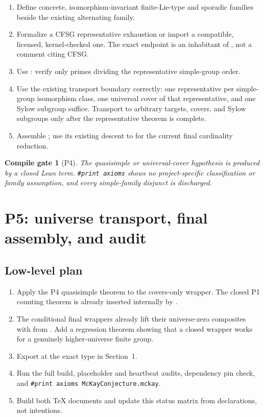 \documentclass[11pt]{article}
\newtheorem{gate}{Compile gate}
\begin{document}
\begin{enumerate}[label=\textbf{P4.\arabic*.},leftmargin=*]
  \item Define concrete, isomorphism-invariant finite-Lie-type and sporadic
  families beside the existing alternating family.
  \item Formalize a CFSG representative exhaustion or import a compatible,
  licensed, kernel-checked one.  The exact endpoint is an inhabitant of
  , not a comment citing CFSG.
  \item Use
  : verify only primes dividing
  the representative simple-group order.
  \item Use the existing transport boundary correctly: one representative
  per simple-group isomorphism class, one universal cover of that
  representative, and one Sylow subgroup suffice.  Transport to arbitrary
  targets, covers, and Sylow subgroups only after the representative theorem
  is complete.
  \item Assemble
  ; use its existing descent
  to  for the current final
  cardinality reduction.
\end{enumerate}

\begin{gate}[P4]
The quasisimple or universal-cover hypothesis is produced by a closed Lean
term.  \texttt{\#print axioms} shows no project-specific classification or
family assumption, and every simple-family disjunct is discharged.
\end{gate}

\section{P5: universe transport, final assembly, and audit}

\subsection*{Low-level plan}

\begin{enumerate}[label=\textbf{P5.\arabic*.},leftmargin=*]
  \item Apply the P4 quasisimple theorem to the covers-only
   wrapper.  The closed P1 counting theorem
  is already inserted internally by .
  \item The conditional final wrappers already lift their universe-zero
  composites with  from
  .  Add a regression theorem showing that a
  closed wrapper works for a genuinely higher-universe finite group.
  \item Export  at the exact type in
  Section~1.
  \item Run the full build, placeholder and heartbeat audits, dependency
  pin check, and \texttt{\#print axioms McKayConjecture.mckay}.
  \item Build both TeX documents and update this status matrix from
  declarations, not intentions.
\end{enumerate}
\end{document}
